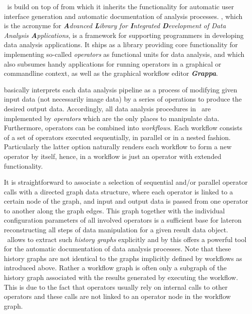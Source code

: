 \mitobo\ is build on top of
\href{http://www.informatik.uni-halle.de/alida}{\alida}\hspace{-0.15cm}\footnotemark[4]
from which it inherits the functionality for automatic user interface generation and automatic
documentation of analysis processes. \alida, which is the acronyme for 
{\em {\bf \em A}dvanced {\bf \em L}ibrary for {\bf \em I}ntegrated {\bf \em D}evelopment of 
Data Analysis {\bf \em A}pplications}, is a framework for supporting programmers in developing 
data analysis applications. It ships as a library providing core functionality for implementing
so-called {\em operators} as functional units for data analysis, and which also subsumes handy 
applications for running operators in a graphical or commandline context, as well as the graphical workflow editor {\bf \em Grappa}.

\alida basically interprets each data analysis pipeline as a 
process of modifying given input data (not necessarily image data) by a series of operations to produce the desired output data. 
Accordingly, all data analysis procedures in \alida\ are implemented by {\em operators} which are the only places to manipulate 
data. Furthermore, operators can be combined into {\em workflows}. 
Each workflow consists of a set of operators executed sequentially, in parallel or in a
nested fashion. Particularly the latter option naturally renders each workflow to form a new 
operator by itself, hence, in \alida a workflow is just an operator with extended functionality.  

It is straightforward to associate a selection of sequential and/or parallel operator calls 
with a directed graph data structure, where each operator is linked to a certain node of the graph, 
and input and output data is passed from one operator to another along the graph edges. This graph
together with the individual configuration parameters of all involved operators is a sufficient base
for lateron reconstructing all steps of data manipulation for a given result data object.
\alida\ allows to extract such {\em history graphs} explicitly and by this offers a powerful tool 
for the automatic documentation of data analysis processes. 
Note that these history graphs are not 
identical to the graphs implicitly defined by workflows as introduced above. 
Rather a workflow graph is often
only a subgraph of the history graph associated with the results generated by executing the 
workflow. This is due to the fact that operators usually rely on internal calls to other operators 
and these calls are not linked to an operator node in the workflow graph.   


